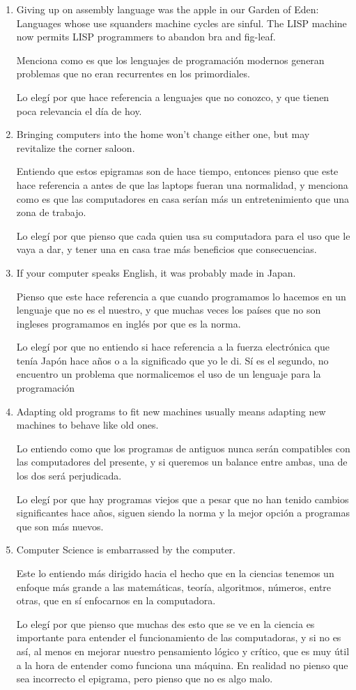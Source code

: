 \documentclass{article}
\begin{document}
\begin{enumerate}
    \item Giving up on assembly language was the apple in our Garden of Eden: Languages whose use squanders machine cycles are sinful. The LISP machine now permits LISP programmers to abandon bra and fig-leaf.
    \par Menciona como es que los lenguajes de programación modernos generan problemas que no eran recurrentes en los primordiales. 
    \par Lo elegí por que hace referencia a lenguajes que no conozco, y que tienen poca relevancia el día de hoy.
    
    \item Bringing computers into the home won’t change either one, but may revitalize the corner saloon.
    \par Entiendo que  estos epigramas son de hace tiempo, entonces pienso que este hace referencia a antes de que las laptops fueran una normalidad, y menciona como es que las computadores en casa serían más un entretenimiento que una zona de trabajo.
    \par Lo elegí por que pienso que cada quien usa su computadora para el uso que le vaya a dar, y tener una en casa trae más beneficios que consecuencias.
    
    \item If your computer speaks English, it was probably made in Japan.
    \par Pienso que este hace referencia a que cuando programamos lo hacemos en un lenguaje que no es el nuestro, y que muchas veces los países que no son ingleses programamos en inglés por que es la norma.
    \par Lo elegí por que no entiendo si hace referencia a la fuerza electrónica que tenía Japón hace años o a la significado que yo le di. Sí es el segundo, no encuentro un problema que normalicemos el uso de un lenguaje para la programación 
    \item Adapting old programs to fit new machines usually means adapting new machines to behave like old ones. 
    \par Lo entiendo como que los programas de antiguos nunca serán compatibles con las computadores del presente, y si queremos un balance entre ambas, una de los dos será perjudicada.
    \par Lo elegí por que hay programas viejos que a pesar que no han tenido cambios significantes hace años, siguen siendo la norma y la mejor opción a programas que son más nuevos.
    \item Computer Science is embarrassed by the computer. 
    \par Este lo entiendo más dirigido hacia el hecho que en la ciencias tenemos un enfoque más grande a las matemáticas, teoría, algoritmos, números, entre otras, que en sí enfocarnos en la computadora.
    \par Lo elegí por que pienso que muchas des esto que se ve en la ciencia es importante para entender el funcionamiento de las computadoras, y si no es así, al menos en mejorar nuestro pensamiento lógico y crítico, que es muy útil a la hora de entender como funciona una máquina. En realidad no pienso que sea incorrecto el epigrama, pero pienso que no es algo malo.

\end{enumerate}
\end{document}
